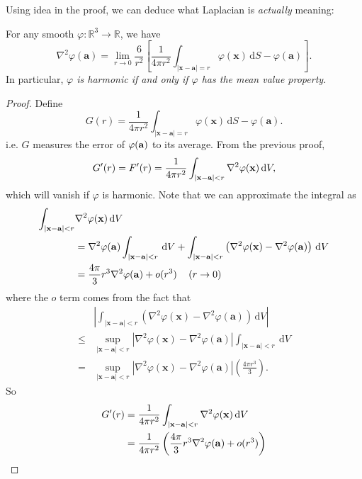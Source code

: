 Using idea in the proof, we can deduce what Laplacian is \textit{actually} meaning:
\begin{proposition}
    For any smooth $ \varphi: \mathbb{R}^{3}\to \mathbb{R} $, we have 
    \[
        \nabla^{2} \varphi(\mathbf{a})=\lim _{r \rightarrow 0} \frac{6}{r^{2}}\left[\frac{1}{4 \pi r^{2}} \int_{|\mathbf{x}-\mathbf{a}|=r} \varphi(\mathbf{x})\, \mathrm{d} S-\varphi(\mathbf{a})\right].
    \]
    In particular, \textit{$ \varphi $ is harmonic if and only if $ \varphi $ has the mean value property.}
\end{proposition}
\begin{proof}
    Define 
    \[
        G(r) = \frac{1}{4 \pi r^{2}} \int_{|\mathbf{x}-\mathbf{a}|=r} \varphi(\mathbf{x})\, \mathrm{d} S-\varphi(\mathbf{a}).
    \]
    i.e. $G$ measures the error of $ \varphi({\bf a}) $ to its average. From the previous proof,
    \[
        G'(r) = F'(r) = \frac{1}{4\pi r^2} \int_{|\bfx-\bfa|<r} \laplacian \varphi(\bfx) \,\mathrm{d}V,
    \]
    which will vanish if $ \varphi $ is harmonic. Note that we can approximate the integral as
    \begin{align*}
        \int_{|\bfx-\bfa|<r} &\laplacian \varphi(\bfx) \,\mathrm{d}V \\
        &= \laplacian \varphi(\bfa)\int_{|\bfx-\bfa|<r} \,\mathrm{d}V + \int_{|\bfx-\bfa|<r} \left( \laplacian \varphi(\bfx)-\laplacian \varphi(\bfa) \right) \,\mathrm{d}V\\ 
        &= \frac{4\pi}{3}r^3\laplacian \varphi(\bfa)+ o(r^3) \quad\left(r \to 0\right)
    \end{align*} 
    where the $o$ term comes from the fact that
    \[
        \begin{aligned}
            &\left|\int_{|\mathbf{x}-\mathbf{a}|<r}\left(\nabla^{2} \varphi(\mathbf{x})-\nabla^{2} \varphi(\mathbf{a})\right) \,\mathrm{d} V\right|\\ 
             \le& \sup _{|\mathbf{x}-\mathbf{a}|<r}\left|\nabla^{2} \varphi(\mathbf{x})-\nabla^{2} \varphi(\mathbf{a})\right| \int_{|\mathbf{x}-\mathbf{a}|<r} \mathrm{~d} V \\
            =&\sup _{|\mathbf{x}-\mathbf{a}|<r}\left|\nabla^{2} \varphi(\mathbf{x})-\nabla^{2} \varphi(\mathbf{a})\right|\left(\frac{4 \pi r^{3}}{3}\right).
        \end{aligned}
    \]
    So 
    \begin{align*}
        G'(r) &= \frac{1}{4\pi r^2}\int_{|\bfx-\bfa|<r} \laplacian \varphi(\bfx) \,\mathrm{d}V\\ 
        &= \frac{1}{4\pi r^2}\left( \frac{4\pi}{3}r^3\laplacian \varphi(\bfa)+ o(r^3) \right)\\ 

\end{align*}
\end{proof}

